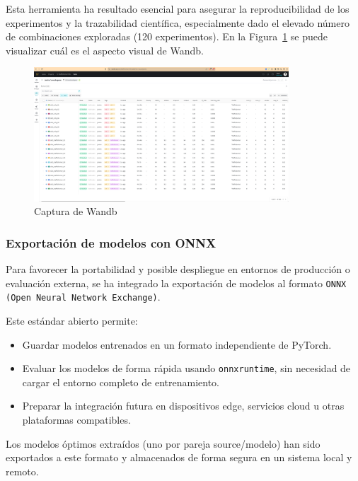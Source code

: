 Esta herramienta ha resultado esencial para asegurar la reproducibilidad de los experimentos y la trazabilidad científica, especialmente dado el elevado número de combinaciones exploradas (120 experimentos). En la Figura~\ref{fig:capt_wandb} se puede visualizar cuál es el aspecto visual de Wandb.

\begin{figure}[H]
	\centering
	\includegraphics[width=0.85\textwidth]{includes/cap5/captura_wandb.png}
	\caption{Captura de Wandb}
	\label{fig:capt_wandb}
\end{figure}

\subsubsection{Exportación de modelos con ONNX}

Para favorecer la portabilidad y posible despliegue en entornos de producción o evaluación externa, se ha integrado la exportación de modelos al formato \texttt{ONNX (Open Neural Network Exchange)}.

Este estándar abierto permite:
\begin{itemize}
	\item Guardar modelos entrenados en un formato independiente de PyTorch.
	\item Evaluar los modelos de forma rápida usando \texttt{onnxruntime}, sin necesidad de cargar el entorno completo de entrenamiento.
	\item Preparar la integración futura en dispositivos edge, servicios cloud u otras plataformas compatibles.
\end{itemize}

Los modelos óptimos extraídos (uno por pareja source/modelo) han sido exportados a este formato y almacenados de forma segura en un sistema local y remoto.

